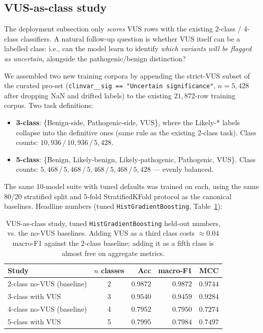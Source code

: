 \documentclass[11pt,a4paper]{article}
\begin{document}
\subsection{VUS-as-class study}
\label{sec:vus-class}

The deployment subsection only \emph{scores}
VUS rows with the existing 2-class / 4-class classifiers. A natural
follow-up question is whether VUS itself can be a labelled class:
i.e., can the model learn to identify \emph{which variants will be
flagged as uncertain}, alongside the pathogenic/benign distinction?

We assembled two new training corpora by appending the strict-VUS subset
of the curated pro-set (\texttt{clinvar\_\_sig == "Uncertain significance"},
$n=5{,}428$ after dropping NaN and drifted labels) to the existing
$21{,}872$-row training corpus. Two task definitions:

\begin{itemize}[leftmargin=*]
 \item \textbf{3-class}: \{Benign-side, Pathogenic-side, VUS\}, where the
 Likely-* labels collapse into the definitive ones (same rule as the
 existing 2-class task). Class counts: $10{,}936\,/\,10{,}936\,/\,5{,}428$.
 \item \textbf{5-class}: \{Benign, Likely-benign, Likely-pathogenic,
 Pathogenic, VUS\}. Class counts: $5{,}468\,/\,5{,}468\,/\,5{,}468\,/\,5{,}468\,/\,5{,}428$ --- evenly balanced.
\end{itemize}

The same 10-model suite with tuned defaults was
trained on each, using the same 80/20 stratified split and 5-fold
StratifiedKFold protocol as the canonical baselines. Headline numbers
(tuned \texttt{HistGradientBoosting}, Table~\ref{tab:vus-class}):

\begin{table}[H]
\centering
\caption{VUS-as-class study, tuned \texttt{HistGradientBoosting}
held-out numbers, vs. the no-VUS baselines. Adding VUS as a third class
costs $\approx 0.04$ macro-F1 against the 2-class baseline; adding it as
a fifth class is almost free on aggregate metrics.}
\label{tab:vus-class}
\small
\begin{tabular}{lcrrr}
\toprule
Study & $n$ classes & Acc & macro-F1 & MCC \\
\midrule
2-class no-VUS (baseline) & 2 & $0.9872$ & $0.9872$ & $0.9744$ \\
3-class with VUS & 3 & $0.9540$ & $\mathbf{0.9459}$ & $0.9284$ \\
4-class no-VUS (baseline) & 4 & $0.7952$ & $0.7950$ & $0.7274$ \\
5-class with VUS & 5 & $0.7995$ & $\mathbf{0.7984}$ & $0.7497$ \\
\bottomrule
\end{tabular}
\end{table}
\end{document}
